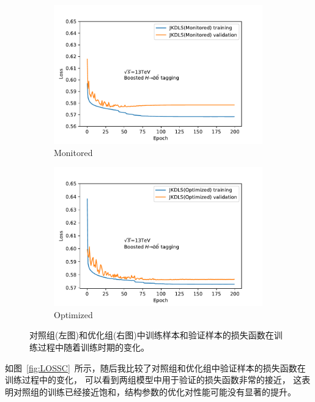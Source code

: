 \begin{figure}[htbp]
  \begin{subfigure}{.5\textwidth}
  \centering
   \includegraphics[width=0.99\textwidth]{figuresXbb/LossMON.pdf}
   \caption{Monitored}
   \label{fig:}
  \end{subfigure}
  \begin{subfigure}{.5\textwidth}
  \centering
   \includegraphics[width=0.99\textwidth]{figuresXbb/LossOPT.pdf}
   \caption{Optimized}
   \label{fig:}
  \end{subfigure}
  \caption{
 对照组(左图)和优化组(右图)中训练样本和验证样本的损失函数在训练过程中随着训练时期的变化。
  }
  \label{fig:LOSS}
\end{figure} 

如图~\ref{fig:LOSSC}~所示，随后我比较了对照组和优化组中验证样本的损失函数在训练过程中的变化，
可以看到两组模型中用于验证的损失函数非常的接近，
这表明对照组的训练已经接近饱和，结构参数的优化对性能可能没有显著的提升。


